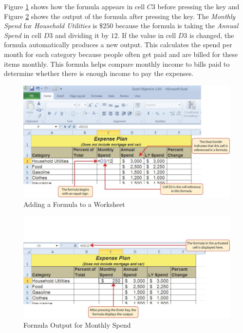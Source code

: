 Figure \ref{02:fig03} shows how the formula appears in cell $ C3 $ before pressing the  key and Figure \ref{02:fig04} shows the output of the formula after pressing the  key. The \textit{Monthly Spend} for \textit{Household Utilities} is $ \$250 $ because the formula is taking the \textit{Annual Spend} in cell $ D3 $ and dividing it by $ 12 $. If the value in cell $ D3 $ is changed, the formula automatically produces a new output. This calculates the spend per month for each category because people often get paid and are billed for these items monthly. This formula helps compare monthly income to bills paid to determine whether there is enough income to pay the expenses.

\begin{figure}[H]
	\centering
	\includegraphics[width=\maxwidth{.95\linewidth}]{gfx/ch02_fig03}
	\caption{Adding a Formula to a Worksheet}
	\label{02:fig03}
\end{figure}

\begin{figure}[H]
	\centering
	\includegraphics[width=\maxwidth{.95\linewidth}]{gfx/ch02_fig04}
	\caption{Formula Output for Monthly Spend}
	\label{02:fig04}
\end{figure}

